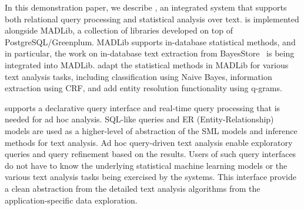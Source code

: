 
In this demonstration paper, we describe \system, an integrated
system that supports both relational query processing and
statistical analysis over text. \system is implemented alongside MADLib,
a collection of libraries developed on 
top of PostgreSQL/Greenplum. MADLib supports
in-database statistical methods, and in particular, the work on in-database text extraction
 from BayesStore~\cite{Wang:2008:BML:1453856.1453896} is being integrated into
 MADLib. \system adapt the statistical methods in MADLib for various text analysis tasks, including classification using Naive Bayes, information extraction using CRF,
and add entity resolution functionality using q-grams.


\system supports a declarative query interface and real-time query
processing that is needed for ad hoc analysis. SQL-like queries
and ER (Entity-Relationship) models are used as a higher-level of
abstraction of the SML models and inference methods for text
analysis. Ad hoc query-driven text analysis enable exploratory
queries and query refinement based on the results. Users of such
query interfaces do not have to know the underlying statistical
machine learning models or the various text analysis tasks being
exercised by the systems. This interface provide a clean abstraction
from the detailed text analysis algorithms from the
application-specific data exploration.


